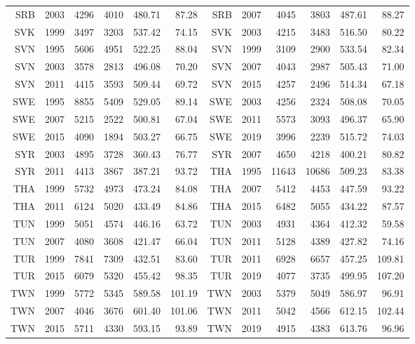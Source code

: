 {\begin{longtable}{r|r|r|r|r|r||r|r|r|r|r|r}
    SRB   & 2003  & 4296  & 4010  & 480.71 & 87.28  & SRB   & 2007  & 4045  & 3803  & 487.61 & 88.27 \\
    SVK   & 1999  & 3497  & 3203  & 537.42 & 74.15  & SVK   & 2003  & 4215  & 3483  & 516.50 & 80.22 \\
    SVN   & 1995  & 5606  & 4951  & 522.25 & 88.04  & SVN   & 1999  & 3109  & 2900  & 533.54 & 82.34 \\
    SVN   & 2003  & 3578  & 2813  & 496.08 & 70.20  & SVN   & 2007  & 4043  & 2987  & 505.43 & 71.00 \\
    SVN   & 2011  & 4415  & 3593  & 509.44 & 69.72  & SVN   & 2015  & 4257  & 2496  & 514.34 & 67.18 \\
    SWE   & 1995  & 8855  & 5409  & 529.05 & 89.14  & SWE   & 2003  & 4256  & 2324  & 508.08 & 70.05 \\
    SWE   & 2007  & 5215  & 2522  & 500.81 & 67.04  & SWE   & 2011  & 5573  & 3093  & 496.37 & 65.90 \\
    SWE   & 2015  & 4090  & 1894  & 503.27 & 66.75  & SWE   & 2019  & 3996  & 2239  & 515.72 & 74.03 \\
    SYR   & 2003  & 4895  & 3728  & 360.43 & 76.77  & SYR   & 2007  & 4650  & 4218  & 400.21 & 80.82 \\
    SYR   & 2011  & 4413  & 3867  & 387.21 & 93.72  & THA   & 1995  & 11643 & 10686 & 509.23 & 83.38 \\
    THA   & 1999  & 5732  & 4973  & 473.24 & 84.08  & THA   & 2007  & 5412  & 4453  & 447.59 & 93.22 \\
    THA   & 2011  & 6124  & 5020  & 433.49 & 84.86  & THA   & 2015  & 6482  & 5055  & 434.22 & 87.57 \\
    TUN   & 1999  & 5051  & 4574  & 446.16 & 63.72  & TUN   & 2003  & 4931  & 4364  & 412.32 & 59.58 \\
    TUN   & 2007  & 4080  & 3608  & 421.47 & 66.04  & TUN   & 2011  & 5128  & 4389  & 427.82 & 74.16 \\
    TUR   & 1999  & 7841  & 7309  & 432.51 & 83.60  & TUR   & 2011  & 6928  & 6657  & 457.25 & 109.81 \\
    TUR   & 2015  & 6079  & 5320  & 455.42 & 98.35  & TUR   & 2019  & 4077  & 3735  & 499.95 & 107.20 \\
    TWN   & 1999  & 5772  & 5345  & 589.58 & 101.19 & TWN   & 2003  & 5379  & 5049  & 586.97 & 96.91 \\
    TWN   & 2007  & 4046  & 3676  & 601.40 & 101.06 & TWN   & 2011  & 5042  & 4566  & 612.15 & 102.44 \\
    TWN   & 2015  & 5711  & 4330  & 593.15 & 93.89  & TWN   & 2019  & 4915  & 4383  & 613.76 & 96.96 \\

\end{longtable}}
